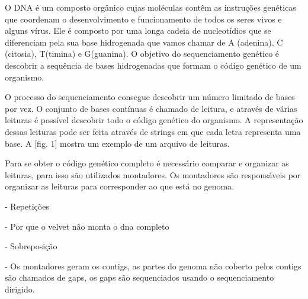 O DNA é um composto orgânico cujas moléculas contêm as instruções genéticas
 que coordenam o desenvolvimento e funcionamento de todos os seres vivos e alguns vírus.
Ele é composto por uma longa cadeia de nucleotídios que se diferenciam pela sua base hidrogenada
que vamos chamar de A (adenina), C (citosia), T(timina) e G(guanina). O objetivo do sequenciamento
genético é descobrir a sequência de bases hidrogenadas que formam o código genético de um organismo.

O processo do sequenciamento consegue descobrir um número limitado de bases por vez. O conjunto de bases
contínuas é chamado de leitura, e através de várias leituras é possível descobrir todo o código genético
do organismo. A representação dessas leituras pode ser feita através de strings em que cada letra representa uma base.
A [fig. 1] mostra um exemplo de um arquivo de leituras.

Para se obter o código genético completo é necessário comparar e organizar as leituras, para isso são utilizados
montadores. Os montadores são responsáveis por organizar as leituras para corresponder ao que está no genoma.


- Repetições

- Por que o velvet não monta o dna completo

- Sobreposição

- Os montadores geram os contigs, as partes do genoma não coberto pelos contigs são chamados de gaps, os gaps são sequenciados usando o sequenciamento dirigido.



